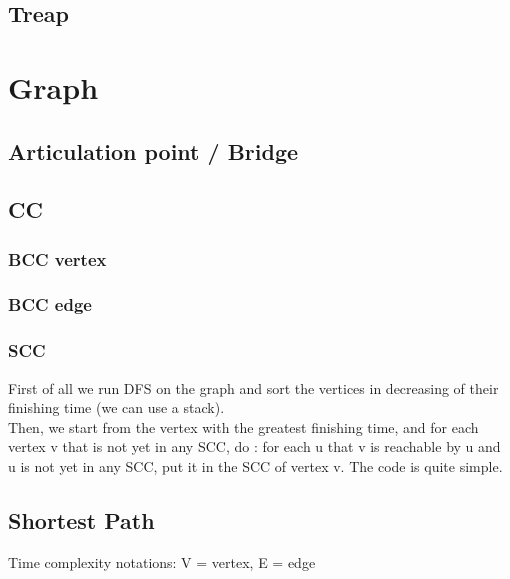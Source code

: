 \documentclass[10pt,oneside]{article}
\begin{document}
\begin{landscape}
\begin{multicols}{2}
\subsection{Treap}



\section{Graph}

\subsection{Articulation point / Bridge}



\subsection{CC}

\subsubsection{BCC vertex}

\subsubsection{BCC edge}

\subsubsection{SCC}

First of all we run DFS on the graph and sort the vertices in decreasing of their finishing time (we can use a stack).\\
Then, we start from the vertex with the greatest finishing time, and for each vertex v that is not yet in any SCC, do : for each u that v is reachable by u and u is not yet in any SCC, put it in the SCC of vertex v. The code is quite simple.

\subsection{Shortest Path}

Time complexity notations: V = vertex, E = edge



\end{multicols}
\end{landscape}
\end{document}
